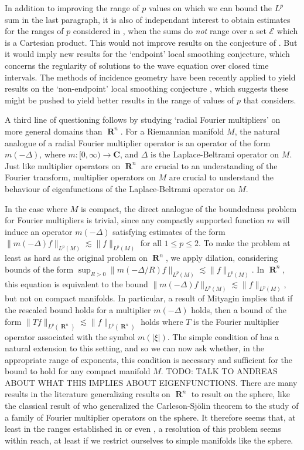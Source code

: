 \documentclass[12pt]{article}
\DeclareMathOperator{\RR}{\mathbf{R}}
\theoremstyle{plain}
\theoremstyle{remark}
\theoremstyle{definition}
\begin{document}
In addition to improving the range of $p$ values on which we can bound the $L^p$ sum in the last paragraph, it is also of independant interest to obtain estimates for the ranges of $p$ considered in \cite{Cladek}, when the sums do \emph{not} range over a set $\mathcal{E}$ which is a Cartesian product. This would not improve results on the conjecture of \cite{GarrigosandSeeger}. But it would imply new results for the `endpoint' local smoothing conjecture, which concerns the regularity of solutions to the wave equation over closed time intervals. The methods of incidence geometry have been recently applied to yield results on the `non-endpoint' local smoothing conjecture \cite{GuthandWangandZhang}, which suggests these might be pushed to yield better results in the range of values of $p$ that \cite{Cladek} considers.

A third line of questioning follows by studying `radial Fourier multipliers' on more general domains than $\RR^n$. For a Riemannian manifold $M$, the natural analogue of a radial Fourier multiplier operator is an operator of the form $m(-\Delta)$, where $m: [0,\infty) \to \mathbf{C}$, and $\Delta$ is the Laplace-Beltrami operator on $M$. Just like multiplier operators on $\RR^n$ are crucial to an understanding of the Fourier transform, multiplier operators on $M$ are crucial to understand the behaviour of eigenfunctions of the Laplace-Beltrami operator on $M$.

In the case where $M$ is compact, the direct analogue of the boundedness problem for Fourier multipliers is trivial, since any compactly supported function $m$ will induce an operator $m(-\Delta)$ satisfying estimates of the form $\| m(-\Delta) f \|_{L^p(M)} \lesssim \| f \|_{L^p(M)}$ for all $1 \leq p \leq 2$. To make the problem at least as hard as the original problem on $\RR^n$, we apply dilation, considering bounds of the form $\sup_{R > 0} \| m(-\Delta/R) f \|_{L^p(M)} \lesssim \| f \|_{L^p(M)}$. In $\RR^n$, this equation is equivalent to the bound $\| m(-\Delta) f \|_{L^p(M)} \lesssim \| f \|_{L^p(M)}$, but not on compact manifolds. In particular, a result of Mityagin implies that if the rescaled bound holds for a multiplier $m(-\Delta)$ holds, then a bound of the form $\| Tf \|_{L^p(\RR^n)} \lesssim \| f \|_{L^p(\RR^n)}$ holds where $T$ is the Fourier multiplier operator associated with the symbol $m(|\xi|)$. The simple condition of \cite{GarrigosandSeeger} has a natural extension to this setting, and so we can now ask whether, in the appropriate range of exponents, this condition is necessary and sufficient for the bound to hold for any compact manifold $M$. TODO: TALK TO ANDREAS ABOUT WHAT THIS IMPLIES ABOUT EIGENFUNCTIONS.  There are many results in the literature generalizing results on $\RR^n$ to result on the sphere, like the classical result of \cite{Sogge} who generalized the Carleson-Sj\"{o}lin theorem to the study of a family of Fourier multiplier operators on the sphere. It therefore seems that, at least in the ranges established in \cite{HeoandNazarovandSeeger} or even \cite{Cladek}, a resolution of this problem seems within reach, at least if we restrict ourselves to simple manifolds like the sphere.
\end{document}
